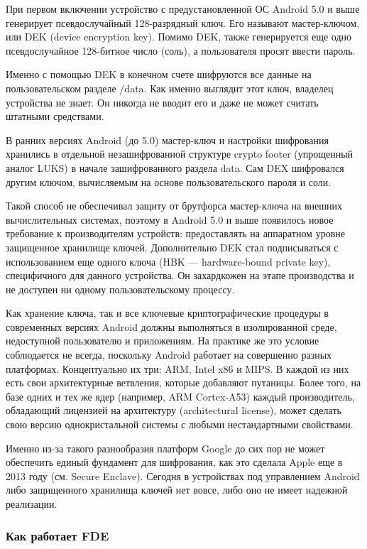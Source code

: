 При первом включении устройство с предустановленной ОС Android 5.0 и выше
генерирует псевдослучайный 128-разрядный ключ. Его называют мастер-ключом, или
DEK (device encryption key). Помимо DEK, также генерируется еще одно
псевдослучайное 128-битное число (соль), а пользователя просят ввести пароль.

Именно с помощью DEK в конечном счете шифруются все данные на пользовательском
разделе /data. Как именно выглядит этот ключ, владелец устройства не знает. Он
никогда не вводит его и даже не может считать штатными средствами.

В ранних версиях Android (до 5.0) мастер-ключ и настройки шифрования хранились
в отдельной незашифрованной структуре crypto footer (упрощенный аналог LUKS) в
начале зашифрованного раздела data. Сам DEX шифровался другим ключом,
вычисляемым на основе пользовательского пароля и соли.

Такой способ не обеспечивал защиту от брутфорса мастер-ключа на внешних
вычислительных системах, поэтому в Android 5.0 и выше появилось новое
требование к производителям устройств: предоставлять на аппаратном уровне
защищенное хранилище ключей. Дополнительно DEK стал подписываться с
использованием еще одного ключа (HBK — hardware-bound private key),
специфичного для данного устройства. Он захардкожен на этапе производства и не
доступен ни одному пользовательскому процессу.

Как хранение ключа, так и все ключевые криптографические процедуры в
современных версиях Android должны выполняться в изолированной среде,
недоступной пользователю и приложениям. На практике же это условие соблюдается
не всегда, поскольку Android работает на совершенно разных платформах.
Концептуально их три: ARM, Intel x86 и MIPS. В каждой из них есть свои
архитектурные ветвления, которые добавляют путаницы. Более того, на базе одних
и тех же ядер (например, ARM Cortex-A53) каждый производитель, обладающий
лицензией на архитектуру (architectural license), может сделать свою версию
однокристальной системы с любыми нестандартными свойствами.

Именно из-за такого разнообразия платформ Google до сих пор не может обеспечить
единый фундамент для шифрования, как это сделала Apple еще в 2013 году (см.
Secure Enclave). Сегодня в устройствах под управлением Android либо защищенного
хранилища ключей нет вовсе, либо оно не имеет надежной реализации.

\subsubsection*{Как работает FDE}

